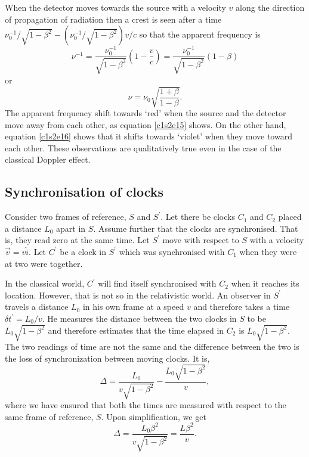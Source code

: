 When the detector moves towards the source with a velocity $v$ along the 
direction of propagation of radiation then a crest is seen after a time 
$\nu_0^{-1}/\sqrt{1 - \beta^2} - (\nu_0^{-1}/\sqrt{1 - \beta^2})v/c$ so that the 
apparent frequency is
\[
\nu^{-1} = \frac{\nu_0^{-1}}{\sqrt{1 - \beta^2}}\left(1 - \frac{v}{c}\right) = 
\frac{\nu_0^{-1}}{\sqrt{1 - \beta^2}}(1 - \beta)
\]
or
\begin{equation}\label{c1s2e16}
\nu = \nu_0\sqrt{\frac{1 + \beta}{1 - \beta}}.
\end{equation}
The apparent frequency shift towards `red' when the source and the detector move
away from each other, as equation \eqref{c1s2e15} shows. On the other hand,
equation \eqref{c1s2e16} shows that it shifts towards `violet' when they move 
toward each other. These observations are qualitatively true even in the case of
the classical Doppler effect.

\subsection{Synchronisation of clocks}
Consider two frames of reference, $S$ and $S^\prime$. Let there be clocks $C_1$
and $C_2$ placed a distance $L_0$ apart in $S$. Assume further that the clocks 
are synchronised. That is, they read zero at the same time. Let $S^\prime$ move
with respect to $S$ with a velocity $\vec{v} = v\hat{i}$. Let $C^\prime$ be a 
clock in $S^\prime$ which was synchronised with $C_1$ when they were at two were 
together.

In the classical world, $C^\prime$ will find itself synchronised with $C_2$ when
it reaches its location. However, that is not so in the relativistic world. An 
observer in $S^\prime$ travels a distance $L_0$ in his own frame at a speed $v$
and therefore takes a time $\delta t^\prime = L_0/v$. He measures the distance 
between the two clocks in $S$ to be $L_0\sqrt{1 - \beta^2}$ and therefore 
estimates that the time elapsed in $C_2$ is $L_0\sqrt{1 - \beta^2}$. The two
readings of time are not the same and the difference between the two is the loss
of synchronization between moving clocks. It is,
\begin{equation}\label{c1s2e17}
\Delta = \frac{L_0}{v\sqrt{1 - \beta^2}} - \frac{L_0\sqrt{1 - \beta^2}}{v},
\end{equation}
where we have ensured that both the times are measured with respect to the same
frame of reference, $S$. Upon simplification, we get
\begin{equation}\label{c1s2e18}
\Delta = \frac{L_0\beta^2}{v\sqrt{1 - \beta^2}} = \frac{L\beta^2}{v}.
\end{equation}

